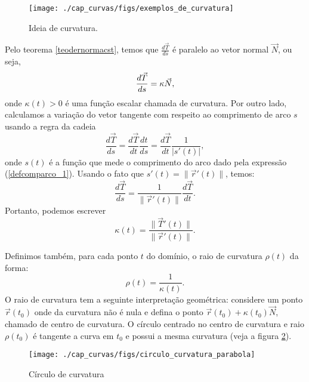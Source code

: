 \begin{figure}
\begin{center}
    \texttt{[image: ./cap\_curvas/figs/exemplos\_de\_curvatura]}
 \caption{Ideia de curvatura.\label{curvatura}}
  \end{center}
\end{figure}
 
Pelo teorema \ref{teodernormacst}, temos que $\frac{d \vec{T} }{ds}$ é paralelo ao vetor normal $\vec{N}$, ou seja,
\begin{equation}{\label{Frenet_1}}
\frac{d \vec{T} }{ds}=\kappa   \vec{N},
\end{equation}
onde $\kappa(t)>0$ é uma função escalar chamada de curvatura. Por outro lado, calculamos a variação do vetor tangente com respeito ao comprimento de arco $s$ usando a regra da cadeia
$$
\frac{d \vec{T} }{ds}=\frac{d \vec{T} }{dt}\frac{dt}{ds}=\frac{d \vec{T} }{dt}\frac{1}{|s'(t)|},
$$
onde $s(t)$ é a função que mede o comprimento do arco dado pela expressão (\ref{defcomparco_1}). Usando o fato que $s'(t)=\|\vec{r}'(t)\|$, temos:
$$
\frac{d \vec{T} }{ds}=\frac{1}{\|\vec{r}'(t)\|}\frac{d \vec{T} }{dt}.
$$
Portanto, podemos escrever
$$
\kappa(t)=\frac{\|\vec{T}'(t)\|}{\|\vec{r}'(t)\|}.
$$

Definimos também, para cada ponto $t$ do domínio, o raio de curvatura $\rho(t)$ da forma:
$$
\rho(t)=\frac{1}{\kappa(t)}.
$$
O raio de curvatura tem a seguinte interpretação geométrica: considere um ponto $\vec{r}(t_0)$ onde da curvatura não é nula e defina o ponto $\vec{r}(t_0)+\kappa(t_0)\vec{N}$, chamado de centro de curvatura. O círculo centrado no centro de curvatura e raio $\rho(t_0)$ é tangente a curva em $t_0$ e possui a mesma curvatura (veja a figura \ref{raio_de_curvatura}).


\begin{figure}
\begin{center}
    \texttt{[image: ./cap\_curvas/figs/circulo\_curvatura\_parabola]}
 \caption{Círculo de curvatura}\label{raio_de_curvatura}
  \end{center}
\end{figure}

